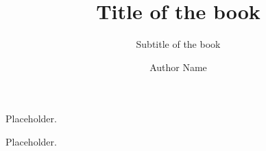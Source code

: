\documentclass[
  bibfile = references.bib,
]{uhmbook}
\title{Title of the book}
\subtitle{Subtitle of the book}
\author{Author Name}
\begin{document}
\frontmatter
\maketitle
\tableofcontents

Placeholder.

Placeholder.

\printglosses   %

\mainmatter




\appendix


\backmatter
\printbibliography
\printindexes
\end{document}
